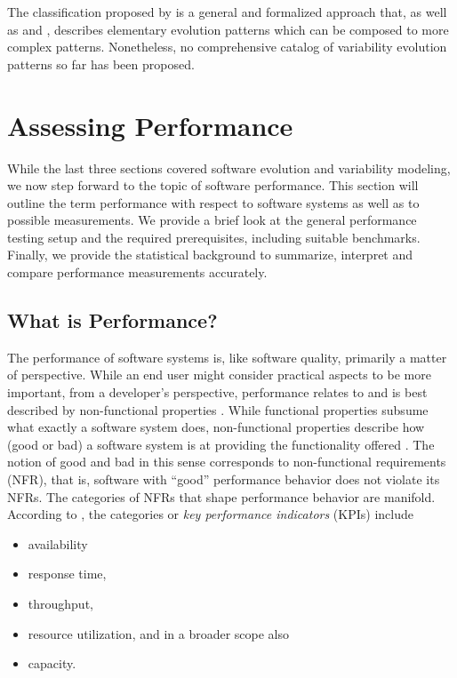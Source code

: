 The classification proposed by \cite{peng_analyzing_2011} is a general and formalized approach
that, as well as \cite{seidl_co-evolution_2012} and \cite{passos_towards_2012}, describes
elementary evolution patterns which can be composed to more complex patterns. Nonetheless, no
comprehensive catalog of variability evolution patterns so far has been
proposed.

\section{Assessing Performance} \label{sec:assessing_performance}
While the last three sections covered software evolution and variability
modeling, we now step forward to the topic of software performance. This
section will outline the term performance with respect to software systems as
well as to possible measurements. We provide a brief look at the general performance
testing setup and the required prerequisites, including suitable benchmarks.
Finally, we provide the statistical background to summarize, interpret and
compare performance measurements accurately.

\subsection{What is Performance?}
The performance of software systems is, like software quality, primarily a
matter of perspective. While an end user might consider practical aspects to be
more important, from a developer’s perspective, performance relates to and is
best described by non-functional properties
\citep{liggesmeyer_software-qualitat:_2009,molyneaux_art_2014}.
While functional properties subsume what exactly a software system does, non-functional
properties describe how (good or bad) a software system is at providing the
functionality offered \citep{liggesmeyer_software-qualitat:_2009}. The notion
of good and bad in this sense corresponds to non-functional requirements (NFR),
that is, software with ``good'' performance behavior does not violate its NFRs.
The categories of NFRs that shape performance behavior are manifold. According to \cite{molyneaux_art_2014}, the categories or
\emph{key performance indicators} (KPIs) include 

\begin{itemize}
  \item availability
  \item response time,
  \item throughput,
  \item resource utilization, and in a broader scope also 
  \item capacity.
\end{itemize}

